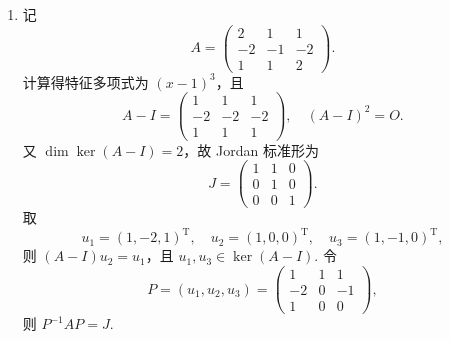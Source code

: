 \begin{enumerate}
    \item 记
    \[
        A=\begin{pmatrix}
        2&1&1\\
        -2&-1&-2\\
        1&1&2
        \end{pmatrix}.
    \]
    计算得特征多项式为 $(x-1)^3$，且
    \[
        A-I=\begin{pmatrix}1&1&1\\-2&-2&-2\\1&1&1\end{pmatrix},\quad (A-I)^2=O.
    \]
    又 $\dim\ker(A-I)=2$，故 Jordan 标准形为
    \[
        J=\begin{pmatrix}1&1&0\\0&1&0\\0&0&1\end{pmatrix}.
    \]
    取
    \[
        u_1=(1,-2,1)^{\mathrm{T}},\quad
        u_2=(1,0,0)^{\mathrm{T}},\quad
        u_3=(1,-1,0)^{\mathrm{T}},
    \]
    则 $(A-I)u_2=u_1$，且 $u_1,u_3\in\ker(A-I)$. 令
    \[
        P=(u_1,u_2,u_3)=
        \begin{pmatrix}
            1&1&1\\
            -2&0&-1\\
            1&0&0
        \end{pmatrix},
    \]
    则 $P^{-1}AP=J$.
\end{enumerate}

\clearpage
